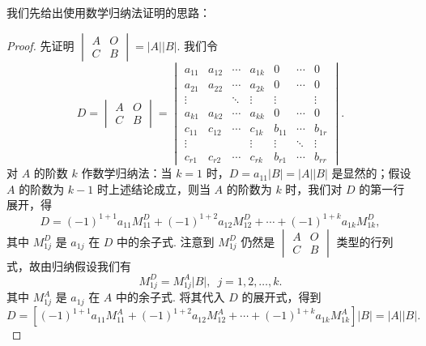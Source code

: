 \begin{enumerate}
          我们先给出使用数学归纳法证明的思路：
          \begin{proof}
            先证明 $\begin{vmatrix}
                        A & O \\ C & B
                    \end{vmatrix} = |A||B|$. 我们令
            \[
                D = \begin{vmatrix}
                        A & O \\ C & B
                    \end{vmatrix} = \begin{vmatrix}
                        a_{11} & a_{12} & \cdots & a_{1k} & 0      & \cdots & 0      \\
                        a_{21} & a_{22} & \cdots & a_{2k} & 0      & \cdots & 0      \\
                        \vdots &        & \ddots & \vdots & \vdots &        & \vdots \\
                        a_{k1} & a_{k2} & \cdots & a_{kk} & 0      & \cdots & 0      \\
                        c_{11} & c_{12} & \cdots & c_{1k} & b_{11} & \cdots & b_{1r} \\
                        \vdots &        &        & \vdots & \vdots & \ddots & \vdots \\
                        c_{r1} & c_{r2} & \cdots & c_{rk} & b_{r1} & \cdots & b_{rr}
                    \end{vmatrix}.
            \]
            对 $A$ 的阶数 $k$ 作数学归纳法：当 $k=1$ 时，$D = a_{11}|B| = |A||B|$ 是显然的；假设 $A$ 的阶数为 $k-1$ 时上述结论成立，则当 $A$ 的阶数为 $k$ 时，我们对 $D$ 的第一行展开，得
            \[
                D = (-1)^{1+1} a_{11} M_{11}^D + (-1)^{1+2} a_{12} M_{12}^D + \cdots + (-1)^{1+k} a_{1k} M_{1k}^D,
            \]
            其中 $M_{1j}^D$ 是 $a_{1j}$ 在 $D$ 中的余子式.
            注意到 $M_{1j}^D$ 仍然是 $\begin{vmatrix}
                A & O \\ C & B
            \end{vmatrix}$ 类型的行列式，故由归纳假设我们有
            \[
                M_{1j}^D = M_{1j}^A |B|, \enspace j = 1, 2, \ldots, k.
            \]
            其中 $M_{1j}^A$ 是 $a_{1j}$ 在 $A$ 中的余子式. 将其代入 $D$ 的展开式，得到
            \[
                D = \left[(-1)^{1+1} a_{11} M_{11}^A + (-1)^{1+2} a_{12} M_{12}^A + \cdots + (-1)^{1+k} a_{1k} M_{1k}^A\right] |B| = |A||B|.
            \]


\end{proof}
\end{enumerate}
